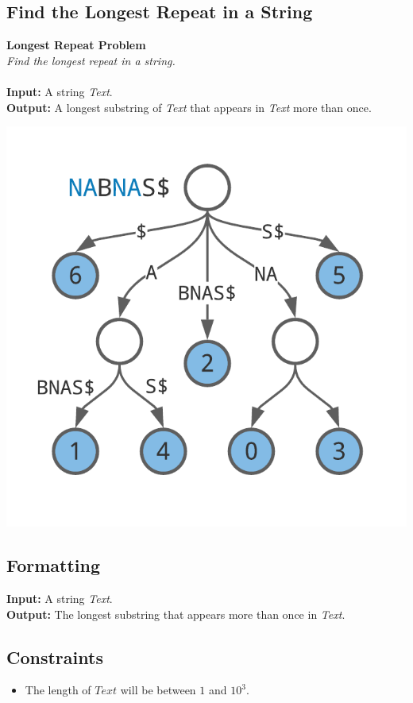 \documentclass{article}
\begin{document}
\subsection{Find the Longest Repeat in a String}
\hline\vspace{5}
\textbf{Longest Repeat Problem}\\
\emph{Find the longest repeat in a string.}\\ \\
\textbf{Input:} A string \emph{Text}.\\
\textbf{Output:} A longest substring of \emph{Text} that appears in \emph{Text} more than once.
\begin{center}
    \includegraphics[scale=0.2]{logos/9D.png} 
\end{center}
\hline\vspace{5}

\subsection*{Formatting}
\noindent\textbf{Input:} A string \emph{Text}.\\
\noindent\textbf{Output:} The longest substring that appears more than once in \emph{Text}.

\subsection*{Constraints}
\begin{itemize}
    \item The length of $Text$ will be between $1$ and $10^3$.
\end{itemize}
\end{document}
